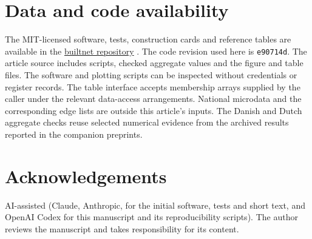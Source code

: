 \section{Data and code availability}

The MIT-licensed software, tests, construction cards and reference tables are available in the \href{https://github.com/Abdulla4akash/builtnet}{builtnet repository} \citep{builtnet2026}. The code revision used here is \texttt{e90714d}. The article source includes scripts, checked aggregate values and the figure and table files. The software and plotting scripts can be inspected without credentials or register records. The table interface accepts membership arrays supplied by the caller under the relevant data-access arrangements. National microdata and the corresponding edge lists are outside this article's inputs. The Danish and Dutch aggregate checks reuse selected numerical evidence from the archived results reported in the companion preprints.

\section*{Acknowledgements}

AI-assisted (Claude, Anthropic, for the initial software, tests and short text, and OpenAI Codex for this manuscript and its reproducibility scripts). The author reviews the manuscript and takes responsibility for its content.
